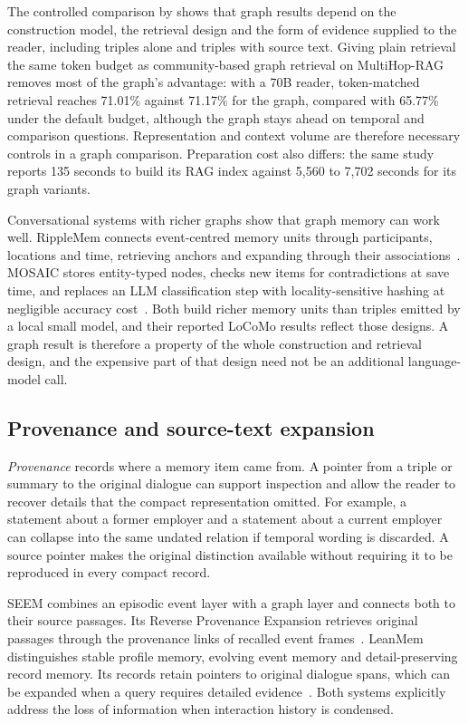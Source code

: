 The controlled comparison by \citet{rag_vs_graphrag} shows that graph results depend on the
construction model, the retrieval design and the form of evidence supplied to the reader,
including triples alone and triples with source text. Giving plain retrieval the same token
budget as community-based graph retrieval on MultiHop-RAG removes most of the graph's
advantage: with a 70B reader, token-matched retrieval reaches 71.01\% against 71.17\% for the
graph, compared with 65.77\% under the default budget, although the graph stays ahead on temporal
and comparison questions. Representation and context volume are therefore necessary controls in a
graph comparison. Preparation cost also differs: the same study reports 135 seconds to build its
RAG index against 5,560 to 7,702 seconds for its graph variants.

Conversational systems with richer graphs show that graph memory can work well. RippleMem
connects event-centred memory units through participants, locations and time, retrieving
anchors and expanding through their associations~\citep{ripplemem}. MOSAIC stores entity-typed
nodes, checks new items for contradictions at save time, and replaces an LLM classification step
with locality-sensitive hashing at negligible accuracy cost~\citep{mosaic}. Both build richer
memory units than triples emitted by a local small model, and their reported LoCoMo results
reflect those designs. A graph result is therefore a property of the whole construction and
retrieval design, and the expensive part of that design need not be an additional language-model
call.

\subsection{Provenance and source-text expansion}

\emph{Provenance} records where a memory item came from. A pointer from a triple or summary
to the original dialogue can support inspection and allow the reader to recover details
that the compact representation omitted. For example, a statement about a former employer
and a statement about a current employer can collapse into the same undated relation if
temporal wording is discarded. A source pointer makes the original distinction available
without requiring it to be reproduced in every compact record.

SEEM combines an episodic event layer with a graph layer and connects both to their source
passages. Its Reverse Provenance Expansion retrieves original passages through the
provenance links of recalled event frames~\citep{seem}. LeanMem distinguishes stable profile
memory, evolving event memory and detail-preserving record memory. Its records retain
pointers to original dialogue spans, which can be expanded when a query requires detailed
evidence~\citep{leanmem}. Both systems explicitly address the loss of information when
interaction history is condensed.

